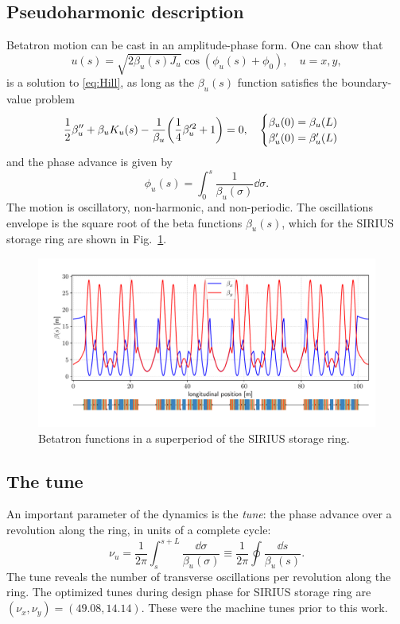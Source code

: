 \subsection{Pseudoharmonic description}
Betatron motion can be cast in an amplitude-phase form. One can show that
\begin{equation}
    u(s) = \sqrt{2\beta_u(s) J_u}\cos(\phi_u(s) + \phi_0),\quad u=x,y,
    \label{eq:pseudo_harmon}
\end{equation}
is a solution to \eqref{eq:Hill}, as long as the $\beta_u(s)$ function satisfies the boundary-value problem
\begin{equation}
    \frac{1}{2}\beta_{u}^{\prime\prime}+\beta_{u} K_u(s) - \frac{1}{\beta_{u}}\qty(\frac{1}{4}\beta_{u}^{\prime 2} + 1 ) = 0, \quad
        \begin{cases}
            \beta_{u}(0) = \beta_{u}(L)\\ \beta_{u}^{\prime}(0) = \beta_{u}^{\prime}(L)
        \end{cases}
    \label{eq:beta_eq}
\end{equation}
and the phase advance is given by
    \begin{equation}
        \phi_u(s) = \int_{0}^{s}\frac{1}{\beta_u(\sigma)}\dd\sigma.
   \end{equation}
The motion is oscillatory, non-harmonic, and non-periodic. The oscillations envelope is the square root of the beta functions $\beta_u(s)$, which for the SIRIUS storage ring are shown in Fig.~\ref{betafunc}.
\begin{figure}[htb]
    \centering
    \includegraphics[width=\textwidth]{Images/beta_functions.pdf}
    \caption[Betatron functions in a superperiod of the SIRIUS storage ring]{Betatron functions in a superperiod of the SIRIUS storage ring.}
    \label{betafunc}
\end{figure}
\subsection{The tune}
An important parameter of the dynamics is the \textit{tune}: the phase advance over a revolution along the ring, in units of a complete cycle:
\begin{equation*}
    \nu_u=\frac{1}{2\pi}\int_{s}^{s+L}\frac{\dd \sigma}{\beta_u(\sigma)}\equiv\frac{1}{2\pi}\oint\frac{\dd s}{\beta_u(s)}.
\end{equation*}
The tune reveals the number of transverse oscillations per revolution along the ring. The optimized tunes during design phase for SIRIUS storage ring are $(\nu_x, \nu_y)=(49.08, 14.14)$. These were the machine tunes prior to this work.

